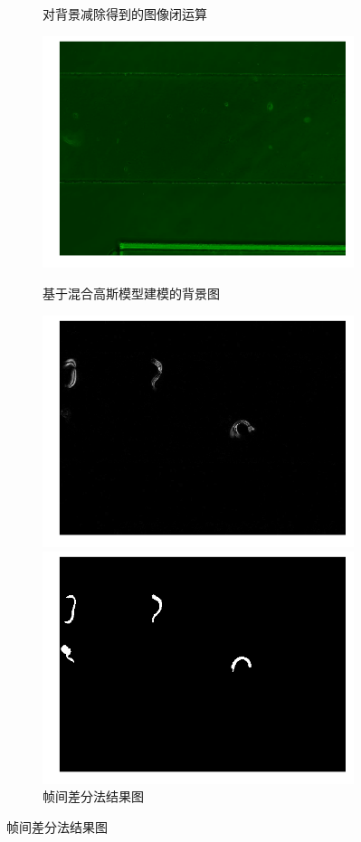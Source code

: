 \begin{figure}[h]
\begin{subfigure}{0.4\textwidth}
	\caption{对背景减除得到的图像闭运算}\label{fig:bgsub:close}
  \end{subfigure}
  \hspace{4em}
  \begin{subfigure}{0.4\textwidth}
    \centering
    \includegraphics[width=1\linewidth]{figure/chap3/bg.png}
    \caption{基于混合高斯模型建模的背景图}
	\includegraphics[width=1\linewidth]{figure/chap3/difffra.png}
	\caption{帧间差分法结果图}
	\includegraphics[width=1\linewidth]{figure/chap3/otsu.png}

\end{subfigure}
\end{figure}
